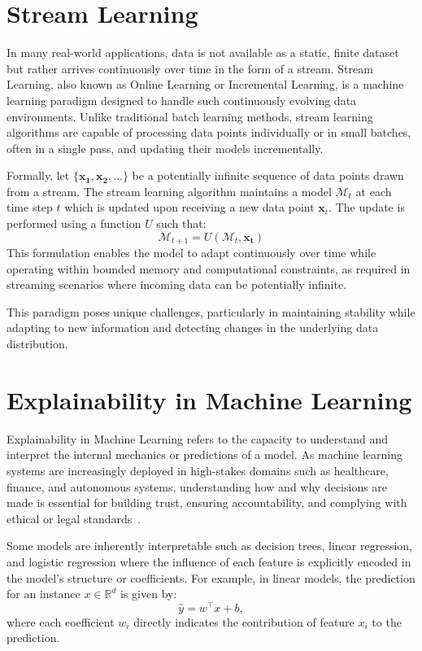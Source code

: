 \section{Stream Learning}\label{sec:stream_learning}
In many real-world applications, data is not available as a static, finite
dataset but rather arrives continuously over time in the form of a stream.
Stream Learning, also known as Online Learning or Incremental Learning, is a
machine learning paradigm designed to handle such continuously evolving data
environments. Unlike traditional batch learning methods, stream learning
algorithms are capable of processing data points individually or in small
batches, often in a single pass, and updating their models incrementally.

Formally, let $\{\mathbf{x_1, x_2,\ldots} \} $ be a potentially infinite
sequence of data points drawn from a stream. The stream learning algorithm
maintains a model $\mathcal{M}_t$ at each time step $t$ which is updated upon
receiving a new data point $\mathbf{x}_t$. The update is performed using a
function $U$ such that:
\begin{equation}
    \mathcal{M}_{t+1} = U(\mathcal{M}_t, \mathbf{x_t})
\end{equation}
This formulation enables the model to adapt continuously over time while
operating within bounded memory and computational constraints, as required
in streaming scenarios where incoming data can be potentially infinite.

This paradigm poses unique challenges, particularly in maintaining stability
while adapting to new information and detecting changes in the underlying data
distribution.

\section{Explainability in Machine Learning}\label{sec:explainability}

Explainability in Machine Learning refers to the capacity to understand and
interpret the internal mechanics or predictions of a model. As machine learning
systems are increasingly deployed in high-stakes domains such as healthcare,
finance, and autonomous systems, understanding how and why decisions are made
is essential for building trust, ensuring accountability, and complying with
ethical or legal standards~\cite{importance_of_explainabilty}.

Some models are inherently interpretable such as decision trees, linear
regression, and logistic regression where the influence of each feature is
explicitly encoded in the model's structure or coefficients. For example, in
linear models, the prediction for an instance $x \in \mathbb{R}^d$ is given by:
\begin{equation}
    \hat{y} = w^\top x + b,
\end{equation}
where each coefficient $w_i$ directly indicates the contribution of feature
$x_i$ to the prediction.

